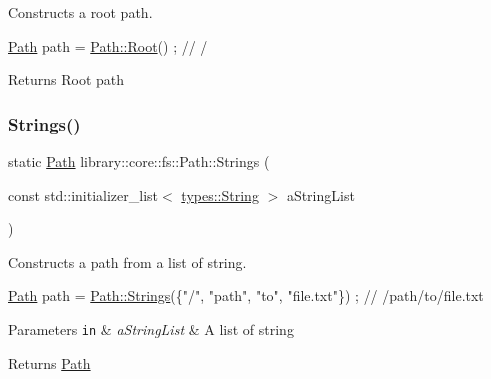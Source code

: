 Constructs a root path. 


\begin{DoxyCode}
\hyperlink{classlibrary_1_1core_1_1fs_1_1_path_aaba9a8e0153813f08f78f1c3275734a4}{Path} path = \hyperlink{classlibrary_1_1core_1_1fs_1_1_path_aa7276f3f578b7ebc40bb0fba7e9c2750}{Path::Root}() ; \textcolor{comment}{// /}
\end{DoxyCode}


\begin{DoxyReturn}{Returns}
Root path 
\end{DoxyReturn}
\mbox{\label{classlibrary_1_1core_1_1fs_1_1_path_a8b5672cb98f78457824137454065897c}} 
\subsubsection{\texorpdfstring{Strings()}{Strings()}}
{\footnotesize\ttfamily static \hyperlink{classlibrary_1_1core_1_1fs_1_1_path}{Path} library\+::core\+::fs\+::\+Path\+::\+Strings (\begin{DoxyParamCaption}\item[{const std\+::initializer\+\_\+list$<$ \hyperlink{classlibrary_1_1core_1_1types_1_1_string}{types\+::\+String} $>$}]{a\+String\+List }\end{DoxyParamCaption})\hspace{0.3cm}{\ttfamily [static]}}



Constructs a path from a list of string. 


\begin{DoxyCode}
\hyperlink{classlibrary_1_1core_1_1fs_1_1_path_aaba9a8e0153813f08f78f1c3275734a4}{Path} path = \hyperlink{classlibrary_1_1core_1_1fs_1_1_path_a8b5672cb98f78457824137454065897c}{Path::Strings}(\{\textcolor{stringliteral}{"/"}, \textcolor{stringliteral}{"path"}, \textcolor{stringliteral}{"to"}, \textcolor{stringliteral}{"file.txt"}\}) ; \textcolor{comment}{// /path/to/file.txt}
\end{DoxyCode}



\begin{DoxyParams}[1]{Parameters}
\mbox{\tt in}  & {\em a\+String\+List} & A list of string \\
\hline
\end{DoxyParams}
\begin{DoxyReturn}{Returns}
\hyperlink{classlibrary_1_1core_1_1fs_1_1_path}{Path} 
\end{DoxyReturn}
\mbox{\label{classlibrary_1_1core_1_1fs_1_1_path_a89cddd92be70121f2537726d69ca6499}} 
